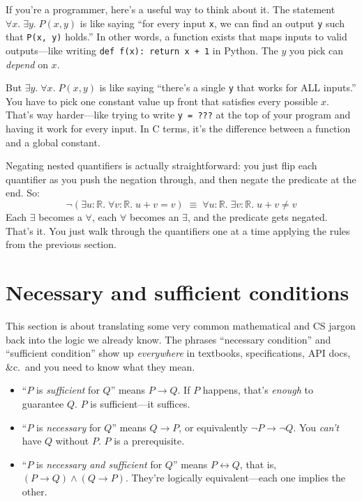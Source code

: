 \documentclass[11pt]{article}
\begin{document}
If you're a programmer, here's a useful way to think about it. The statement $\forall x.\;\exists y.\; P(x,y)$ is like saying ``for every input \texttt{x}, we can find an output \texttt{y} such that \texttt{P(x, y)} holds.'' In other words, a function exists that maps inputs to valid outputs---like writing \texttt{def f(x): return x + 1} in Python. The $y$ you pick can \emph{depend} on $x$.

But $\exists y.\;\forall x.\; P(x,y)$ is like saying ``there's a single \texttt{y} that works for ALL inputs.'' You have to pick one constant value up front that satisfies every possible $x$. That's way harder---like trying to write \texttt{y = ???} at the top of your program and having it work for every input. In C terms, it's the difference between a function and a global constant.

Negating nested quantifiers is actually straightforward: you just flip each quantifier as you push the negation through, and then negate the predicate at the end. So:
\[
\neg(\exists u : \mathbb{R}.\;\forall v : \mathbb{R}.\; u + v = v) \;\equiv\; \forall u : \mathbb{R}.\;\exists v : \mathbb{R}.\; u + v \neq v
\]
Each $\exists$ becomes a $\forall$, each $\forall$ becomes an $\exists$, and the predicate gets negated. That's it. You just walk through the quantifiers one at a time applying the rules from the previous section.

\section{Necessary and sufficient conditions}
This section is about translating some very common mathematical and CS jargon back into the logic we already know. The phrases ``necessary condition'' and ``sufficient condition'' show up \emph{everywhere} in textbooks, specifications, API docs, \&c.\ and you need to know what they mean.

\begin{definition}
\leavevmode
\begin{itemize}
  \item ``$P$ is \emph{sufficient} for $Q$'' means $P \to Q$. If $P$ happens, that's \emph{enough} to guarantee $Q$. $P$ is sufficient---it suffices.
  \item ``$P$ is \emph{necessary} for $Q$'' means $Q \to P$, or equivalently $\neg P \to \neg Q$. You \emph{can't} have $Q$ without $P$. $P$ is a prerequisite.
  \item ``$P$ is \emph{necessary and sufficient} for $Q$'' means $P \leftrightarrow Q$, that is, $(P \to Q) \wedge (Q \to P)$. They're logically equivalent---each one implies the other.
\end{itemize}
\end{definition}
\end{document}
